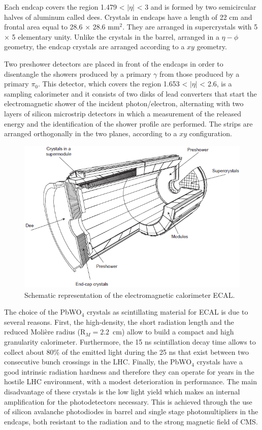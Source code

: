 Each endcap covers the region 1.479 < $|\eta|$ < 3 and is formed by two semicircular halves
of aluminum called dees. Crystals in endcaps have a length of 22 cm and frontal area
equal to 28.6 × 28.6 mm$^2$. They are arranged in supercrystals with 5 × 5 elementary unity.
Unlike the crystals in the barrel, arranged in a $\eta - \phi $ geometry, the endcap crystals are
arranged according to a $xy$ geometry.

Two preshower detectors are placed in front of the endcaps in order to disentangle the
showers produced by a primary $\gamma$ from those produced by a primary $\pi_0$. This detector,
which covers the region 1.653 <  $|\eta|$ < 2.6, is a sampling calorimeter and it consists of two
disks of lead converters  that start the electromagnetic
shower of the incident photon/electron, alternating with two layers of silicon microstrip
detectors in which a measurement of the released energy and the identification of the
shower profile are performed. The strips are arranged orthogonally in the two planes,
according to a $xy$ configuration.
\begin{figure}
\centering
\includegraphics[scale= 0.5]{../Cap2/ecal_all}
\caption{Schematic representation of the electromagnetic calorimeter ECAL.}
\label{ecal_all}
\end{figure}

The choice of the PbWO$_4$ crystals as scintillating material for ECAL is due to several
reasons. First, the high-density, the short radiation length  and the
reduced Molière radius (R$_M = 2.2$~cm) allow to build a compact and
high granularity calorimeter. Furthermore, the 15 ns scintillation
decay time allows to collect about 80\% of the emitted light during
the 25 ns that exist between two consecutive bunch crossings in the
LHC. Finally, the PbWO$_4$ crystals have a 
good intrinsic radiation hardness and therefore they can operate for years in the hostile
LHC environment, with a modest deterioration in performance. The main disadvantage
of these crystals is the low light yield  which makes an internal
amplification for the photodetectors necessary. This is achieved through the use of silicon
avalanche photodiodes  in barrel and single stage photomultipliers  in the endcaps, both resistant to the radiation and to the strong
magnetic field of CMS.


